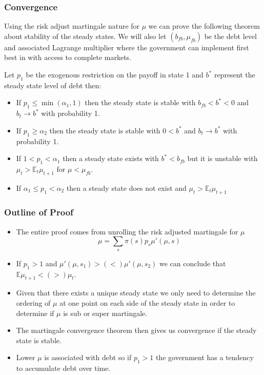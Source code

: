 \documentclass{beamer}
\newcommand{\EE}{\mathbb E}
\begin{document}
 \begin{frame}
  \frametitle{Convergence}
	Using the risk adjust martingale nature for $\mu$ we can prove the following theorem about stability of the steady states.  We will also let $(b_{fb},\mu_{fb})$ be the debt level and associated Lagrange multiplier where the government can implement first best in with access to complete markets.
	\begin{theorem}
		Let $p_1$ be the exogenous restriction on the payoff in state 1 and $b^*$ represent the steady state level of debt then:
		\begin{itemize}
			\item  If $p_1\leq\min(\alpha_1,1)$ then the steady state is stable with $b_{fb}<b^*<0$ and $b_t\rightarrow b^*$ with probability 1.
			\item If $p_1 \geq \alpha_2$ then the steady state is stable with $0<b^*$ and $b_t \rightarrow b^*$ with probability 1.
			\item  If $1 < p_1 <\alpha_1$ then a steady state exists with $b^* < b_{fb}$ but it is unstable with $\mu_t >\EE_t \mu_{t+1}$ for $\mu < \mu_{fb}$.
			\item  If $\alpha_1\leq p_1<\alpha_2$ then a steady state does not exist and $\mu_t > \EE_t\mu_{t+1}$
		\end{itemize} 
	\end{theorem} 
 \end{frame}

 
 \begin{frame}
  \frametitle{Outline of Proof}
  \begin{itemize}
	\item  The entire proof comes from unrolling the risk adjusted martingale for $\mu$
	\[ 
			\mu = \sum_s \pi(s) p_s \mu'(\mu,s)
	\]
	\item  If $p_1 >1$ and $\mu'(\mu,s_1) > (<) \mu'(\mu,s_2)$ we can conclude that $\EE\mu_{t+1} < (>)\mu_t$.
	\item  Given that there exists a unique steady state we only need to determine the ordering of $\mu$ at one point on each side of the steady state in order to determine if $\mu$ is sub or super martingale.
	\item The martingale convergence theorem then gives us convergence if the steady state is stable.
	\item  Lower $\mu$ is associated with debt so if $p_1 > 1$ the government has a tendency to accumulate debt over time.
\end{itemize}
 \end{frame}
\end{document}
